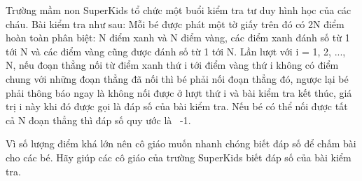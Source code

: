 Trường mầm non SuperKids tổ chức một buổi kiểm tra tư duy hình học của các cháu. Bài kiểm tra như sau: Mỗi bé được phát một tờ giấy trên đó có 2N điểm hoàn toàn phân biệt: N điểm xanh và N điểm vàng, các điểm xanh đánh số từ 1 tới N và các điểm vàng cũng được đánh số từ 1 tới N. Lần lượt với i = 1, 2, ..., N, nếu đoạn thẳng nối từ điểm xanh thứ i tới điểm vàng thứ i không có điểm chung với những đoạn thẳng đã nối thì bé phải nối đoạn thẳng đó, ngược lại bé phải thông báo ngay là không nối được ở lượt thứ i và bài kiểm tra kết thúc, giá trị i này khi đó được gọi là đáp số của bài kiểm tra. Nếu bé có thể nối được tất cả N đoạn thẳng thì đáp số quy ước là  -1.  

   Vì số lượng điểm khá lớn nên cô giáo muốn nhanh chóng biết đáp số để chấm bài cho các bé. Hãy giúp các cô giáo của trường SuperKids biết đáp số của bài kiểm tra.